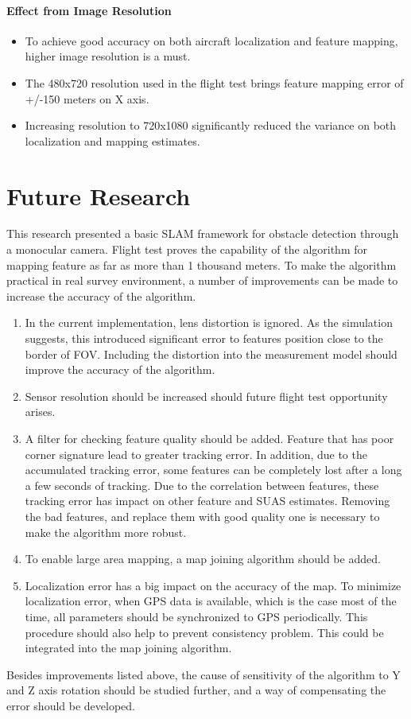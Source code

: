 \paragraph{Effect from Image Resolution}
\begin{itemize}
  \item To achieve good accuracy on both aircraft localization and
  feature mapping, higher image resolution is a must. 
  \item The 480x720 resolution used in the flight test brings feature
  mapping error of +/-150 meters on X axis.
  \item Increasing resolution to 720x1080 significantly reduced the
  variance on both localization and mapping estimates. 
\end{itemize}

\section{Future Research}
This research presented a basic SLAM framework for obstacle detection
through a monocular camera. Flight test proves the capability of the
algorithm for mapping feature as far as more than 1 thousand meters.
To make the algorithm practical in real survey environment, a number
of improvements can be made to increase the accuracy of the algorithm.
\begin{enumerate}
  \item In the current implementation, lens distortion is ignored. As
  the simulation suggests, this introduced significant error to
  features position close to the border of FOV. Including the
  distortion into the measurement model should improve the accuracy of
  the algorithm.
  \item Sensor resolution should be increased should future flight
  test opportunity arises. 
  \item A filter for checking feature quality should be
  added. Feature that has poor corner signature lead to greater
  tracking error. In addition, due to the accumulated tracking error,
  some features can be completely lost after a long a few seconds of
  tracking. Due to the correlation between features, these tracking
  error has impact on other feature and SUAS estimates. Removing the
  bad features, and replace them with good quality one is necessary to
  make the algorithm more robust. 
  \item To enable large area mapping, a map joining algorithm should
  be added.
  \item Localization error has a big impact on the accuracy of the
  map. To minimize localization error, when GPS data is available,
  which is the case most of the time, all parameters should be
  synchronized to GPS periodically. This procedure should also help
  to prevent consistency problem. This could be integrated into the
  map joining algorithm.  
\end{enumerate}

Besides improvements listed above, the cause of sensitivity of the
algorithm to Y and Z axis rotation should be studied further, and a
way of compensating the error should be developed. 

